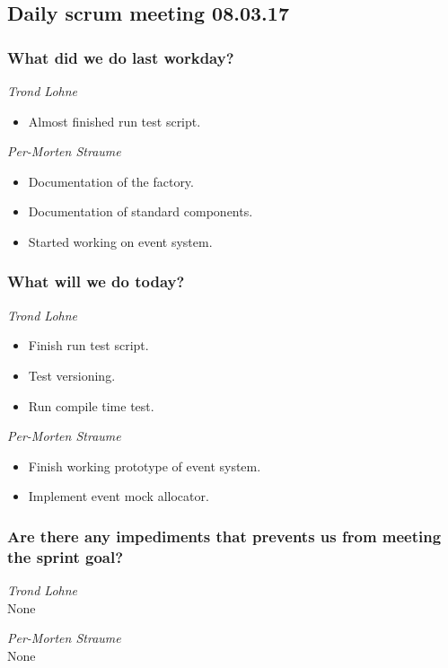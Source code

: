 \documentclass{article}
\begin{document}
\begin{center}
\subsection*{Daily scrum meeting 08.03.17}
\end{center}
\bigskip


\subsubsection*{What did we do last workday?}

\noindent\textit{Trond Lohne}
\begin{itemize}
	\item 
	Almost finished run test script.
\end{itemize}

\medskip

\noindent\textit{Per-Morten Straume}
\begin{itemize}
	\item 
	Documentation of the factory.
	
	\item 
	Documentation of standard components.
	
	\item 
    Started working on event system.
\end{itemize}


\subsubsection*{What will we do today?}

\noindent\textit{Trond Lohne}
\begin{itemize}
	\item 
	Finish run test script.
	
	\item 
	Test versioning.
	
	\item 
	Run compile time test.
\end{itemize}

\medskip

\noindent\textit{Per-Morten Straume}
\begin{itemize}
	\item 
	Finish working prototype of event system.
    
	\item 
	Implement event mock allocator.
\end{itemize}


\subsubsection*{Are there any impediments that prevents us from meeting the sprint goal?}

\noindent\textit{Trond Lohne}\\
None

\medskip

\noindent\textit{Per-Morten Straume}\\
None
\end{document}
